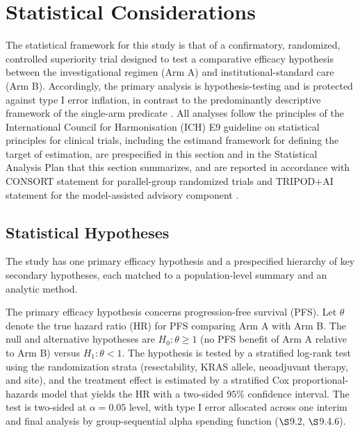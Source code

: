 \section{Statistical Considerations}

The statistical framework for this study is that of a confirmatory, randomized,
controlled superiority trial designed to test a comparative efficacy hypothesis
between the investigational regimen (Arm A) and institutional-standard care (Arm B).
Accordingly, the primary analysis is hypothesis-testing and is protected against type
I error inflation, in contrast to the predominantly descriptive framework of the
single-arm predicate \cite{kawchak2026phase1}. All analyses follow the principles of
the International Council for Harmonisation (ICH) E9 guideline on statistical
principles for clinical trials, including the estimand framework for defining the
target of estimation, are prespecified in this section and in the Statistical
Analysis Plan that this section summarizes, and are reported in accordance with
CONSORT statement for parallel-group randomized trials \cite{Schulz2010consort} and TRIPOD+AI statement for the model-assisted advisory component
\cite{Collins2024tripodai}.

\subsection{Statistical Hypotheses}

The study has one primary efficacy hypothesis and a prespecified hierarchy of key
secondary hypotheses, each matched to a population-level summary and an analytic
method.

The primary efficacy hypothesis concerns progression-free survival (PFS). Let
$\theta$ denote the true hazard ratio (HR) for PFS comparing Arm A with Arm B. The
null and alternative hypotheses are $H_0\!: \theta \geq 1$ (no PFS benefit of Arm A
relative to Arm B) versus $H_1\!: \theta < 1$. The hypothesis is tested by a
stratified log-rank test using the randomization strata (resectability, KRAS allele,
neoadjuvant therapy, and site), and the treatment effect is estimated by a stratified
Cox proportional-hazards model that yields the HR with a two-sided $95\%$ confidence
interval. The test is two-sided at $\alpha = 0.05$ level, with type I error
allocated across one interim and final analysis by group-sequential alpha
spending function ($\S$9.2, $\S$9.4.6).

